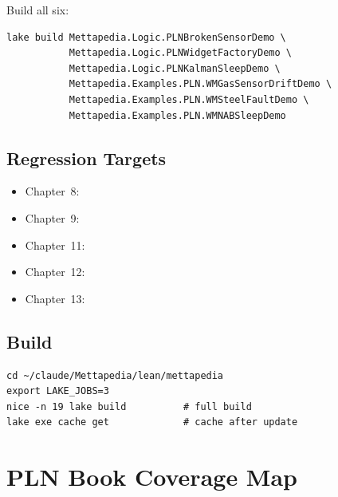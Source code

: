 \documentclass[11pt,openany]{report}
\begin{document}
\noindent
Build all six:
\begin{lstlisting}
lake build Mettapedia.Logic.PLNBrokenSensorDemo \
           Mettapedia.Logic.PLNWidgetFactoryDemo \
           Mettapedia.Logic.PLNKalmanSleepDemo \
           Mettapedia.Examples.PLN.WMGasSensorDriftDemo \
           Mettapedia.Examples.PLN.WMSteelFaultDemo \
           Mettapedia.Examples.PLN.WMNABSleepDemo
\end{lstlisting}

\section{Regression Targets}

\begin{itemize}
\item Chapter~8: 
\item Chapter~9: 
\item Chapter~11: 
\item Chapter~12: 
\item Chapter~13: 
\end{itemize}

\section{Build}

\begin{lstlisting}
cd ~/claude/Mettapedia/lean/mettapedia
export LAKE_JOBS=3
nice -n 19 lake build          # full build
lake exe cache get             # cache after update
\end{lstlisting}


\chapter{PLN Book Coverage Map}
\label{app:coverage-map}
\end{document}
